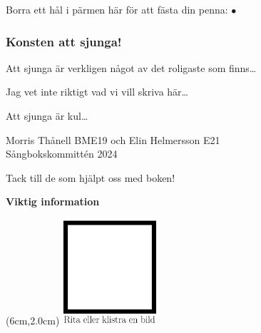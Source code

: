 
Borra ett hål i pärmen här för att fästa din penna: {\Huge $\bullet$}

\subsubsection*{Konsten att sjunga!}
Att sjunga är verkligen något av det roligaste som finns\dots


Jag vet inte riktigt vad vi vill skriva här\dots

Att sjunga är kul\dots



Morris Thånell BME19 och Elin Helmersson E21\\
Sångbokskommittén 2024



\newpage

Tack till de som hjälpt oss med boken!

\newpage

\begin{center}
    \textbf{Viktig information}
\end{center}


\begin{textblock*}{6cm}(6cm,2.0cm) %
  \includegraphics[width=3.5cm]{./bilder/profilbild_stor.png} %
\end{textblock*}


